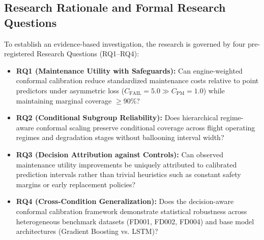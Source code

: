 \documentclass[12pt,a4paper]{article}
\begin{document}
\subsection{Research Rationale and Formal Research Questions}
To establish an evidence-based investigation, the research is governed by four pre-registered Research Questions (RQ1--RQ4):
\begin{itemize}[leftmargin=1.5em]
    \item \textbf{RQ1 (Maintenance Utility with Safeguards):} Can engine-weighted conformal calibration reduce standardized maintenance costs relative to point predictors under asymmetric loss ($C_{\text{FAIL}}=5.0 \gg C_{\text{PM}}=1.0$) while maintaining marginal coverage $\ge 90\%$?
    \item \textbf{RQ2 (Conditional Subgroup Reliability):} Does hierarchical regime-aware conformal scaling preserve conditional coverage across flight operating regimes and degradation stages without ballooning interval width?
    \item \textbf{RQ3 (Decision Attribution against Controls):} Can observed maintenance utility improvements be uniquely attributed to calibrated prediction intervals rather than trivial heuristics such as constant safety margins or early replacement policies?
    \item \textbf{RQ4 (Cross-Condition Generalization):} Does the decision-aware conformal calibration framework demonstrate statistical robustness across heterogeneous benchmark datasets (FD001, FD002, FD004) and base model architectures (Gradient Boosting vs. LSTM)?
\end{itemize}

\end{document}
